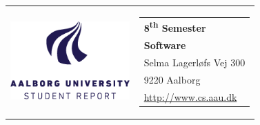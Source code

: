\begin{titlepage}
    \setlength{\textwidth}{15cm}
    \noindent
    \begin{nopagebreak}
        {\samepage
            \begin{tabular}{lr}
                \parbox{0.40\textwidth}{\raisebox{11mm}
                    {\includegraphics[height=3cm]{img/aau-logo-english.png}}
                } &
                \parbox{0.4\textwidth}{
                    \small
                    \begin{tabular}{l}
                        {\sf\small \textbf{8\textsuperscript{th} Semester}}\\
                        {\sf\small \textbf{Software}}\\
                        {\sf\small Selma Lagerløfs Vej 300 } \\
                        {\sf\small 9220 Aalborg} \\
                        {\sf\small \url{http://www.cs.aau.dk}}
                    \end{tabular}
                }
            \end{tabular}

}
\end{nopagebreak}
\end{titlepage}
